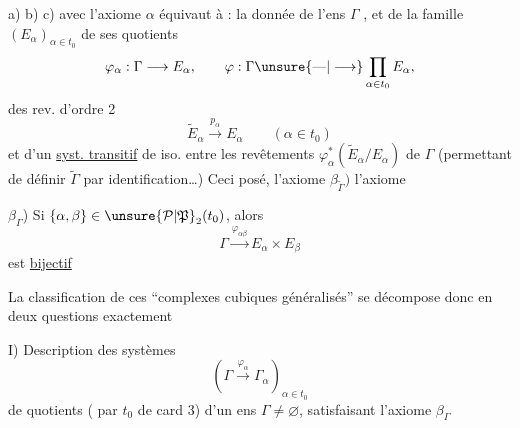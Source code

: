 a) b) c) avec l'axiome $\alpha$ équivaut à : la donnée de l'ens $\Gamma$ \inserted{$\ne\varnothing$}, et de la famille $(E_\alpha)_{\alpha\in t_0}$ de ses quotients
\[
\varphi_\alpha:\Gamma\longrightarrow E_\alpha,\qquad
\varphi:\Gamma\unsure{\text{---}|\longrightarrow}\prod_{\alpha\in t_0}E_\alpha,
\]
 des rev. d'ordre 2
\[
\widetilde E_\alpha\xrightarrow{p_\alpha} E_\alpha\qquad(\alpha\in t_0)
\]
et d'un \uline{syst. transitif} de \inserted{$\Gamma$-}iso. entre les revêtements $\varphi_\alpha^*(\widetilde E_\alpha/E_\alpha)$ de $\Gamma$ (permettant de définir $\widetilde\Gamma$ par identification\ldots) Ceci posé, l'axiome $\beta_{\widetilde\Gamma})$  l'axiome

$\beta_\Gamma$) Si $\{\alpha,\beta\}\in\unsure{\mathcal P|\mathfrak P}_2(t_0)$, alors
\[
\Gamma\xrightarrow{\varphi_{\alpha\beta}}E_\alpha\times E_\beta
\]
est \uline{bijectif}

La classification de ces ``complexes cubiques généralisés''  se décompose donc en deux questions exactement

I) Description des systèmes
\[
\left(\Gamma\xrightarrow{\varphi_\alpha}\Gamma_\alpha\right)_{\alpha\in t_0}
\]
de quotients ( par $t_0$ de card 3) d'un ens $\Gamma\ne\varnothing$, satisfaisant l'axiome $\beta_\Gamma$
